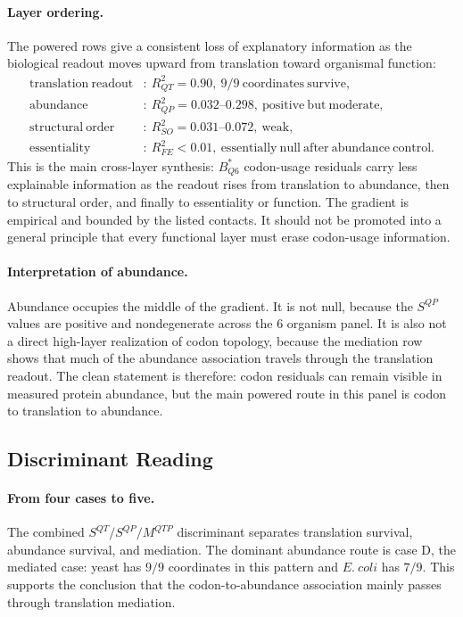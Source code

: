 \paragraph{Layer ordering.}
The powered rows give a consistent loss of explanatory information as the biological readout moves upward from translation toward organismal function:
$$
\begin{aligned}
\mathrm{translation\ readout} &:\ R^2_{QT}=0.90,\ 9/9\ \mathrm{coordinates\ survive},\\
\mathrm{abundance} &:\ R^2_{QP}=0.032\mbox{--}0.298,\ \mathrm{positive\ but\ moderate},\\
\mathrm{structural\ order} &:\ R^2_{SO}=0.031\mbox{--}0.072,\ \mathrm{weak},\\
\mathrm{essentiality} &:\ R^2_{FE}<0.01,\ \mathrm{essentially\ null\ after\ abundance\ control}.
\end{aligned}
$$
This is the main cross-layer synthesis: $B^*_{Q6}$ codon-usage residuals carry less explainable information as the readout rises from translation to abundance, then to structural order, and finally to essentiality or function.  The gradient is empirical and bounded by the listed contacts.  It should not be promoted into a general principle that every functional layer must erase codon-usage information.

\paragraph{Interpretation of abundance.}
Abundance occupies the middle of the gradient.  It is not null, because the $S^{QP}$ values are positive and nondegenerate across the $6$ organism panel.  It is also not a direct high-layer realization of codon topology, because the mediation row shows that much of the abundance association travels through the translation readout.  The clean statement is therefore: codon residuals can remain visible in measured protein abundance, but the main powered route in this panel is codon to translation to abundance.

\subsection{Discriminant Reading}

\paragraph{From four cases to five.}
The combined $S^{QT}/S^{QP}/M^{QTP}$ discriminant separates translation survival, abundance survival, and mediation.  The dominant abundance route is case D, the mediated case: yeast has $9/9$ coordinates in this pattern and $E.\ coli$ has $7/9$.  This supports the conclusion that the codon-to-abundance association mainly passes through translation mediation.

